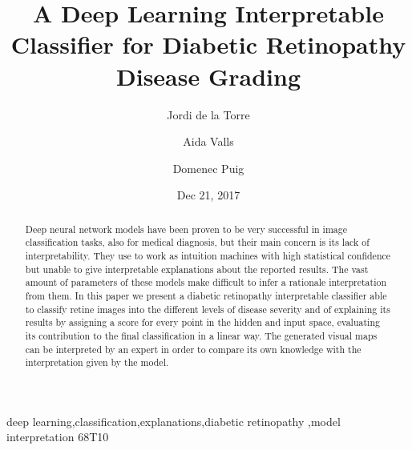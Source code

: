\documentclass[preprint]{elsarticle}
\theoremstyle{definition} %
\theoremstyle{remark}
\begin{document}
\begin{frontmatter}

\title{A Deep Learning Interpretable Classifier for Diabetic Retinopathy Disease Grading}

\author[rvt]{Jordi de la Torre}
\author[rvt]{Aida Valls}
\author[rvt]{Domenec Puig}


\address[rvt]{Departament d'Enginyeria Inform\`atica i Matem\`atiques.\\Escola T\`ecnica Superior d'Enginyeria.\\Universitat Rovira i Virgili\\Avinguda Paisos Catalans, 26. E-43007\\
Tarragona, Spain}

\date{Dec 21, 2017}

\begin{abstract}
Deep neural network models have been proven to be very successful in image classification tasks, also for medical diagnosis, but their main concern is its lack of interpretability. They use to work as intuition machines with high statistical confidence but unable to give interpretable explanations about the reported results. The vast amount of parameters of these models make difficult to infer a rationale interpretation from them. In this paper we present a diabetic retinopathy interpretable classifier able to classify retine images into the different levels of disease severity and of explaining its results by assigning a score for every point in the hidden and input space, evaluating its contribution to the final classification in a linear way. The generated visual maps can be interpreted by an expert in order to compare its own knowledge with the interpretation given by the model. 
\end{abstract}

\begin{keyword}
deep learning\sep classification\sep explanations\sep diabetic retinopathy \sep model interpretation
\MSC[2010] 68T10
\end{keyword}

\end{frontmatter}

\end{document}
